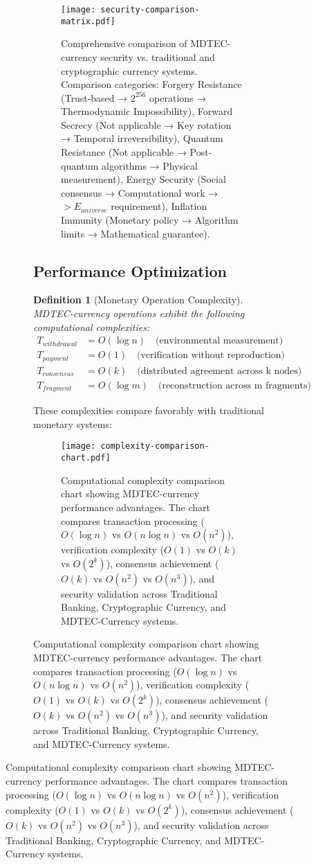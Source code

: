 \documentclass[12pt,a4paper]{article}
\newtheorem{definition}[theorem]{Definition}
\begin{document}
\begin{figure}[H]
\begin{figure}[H]
\begin{figure}[H]
\centering
\texttt{[image: security-comparison-matrix.pdf]}
\caption{Comprehensive comparison of MDTEC-currency security vs. traditional and cryptographic currency systems. Comparison categories: Forgery Resistance (Trust-based → $2^{256}$ operations → Thermodynamic Impossibility), Forward Secrecy (Not applicable → Key rotation → Temporal irreversibility), Quantum Resistance (Not applicable → Post-quantum algorithms → Physical measurement), Energy Security (Social consensus → Computational work → $>E_{universe}$ requirement), Inflation Immunity (Monetary policy → Algorithm limits → Mathematical guarantee).}
\label{fig:security_comparison}
\end{figure}

\subsection{Performance Optimization}

\begin{definition}[Monetary Operation Complexity]
MDTEC-currency operations exhibit the following computational complexities:
\begin{align}
T_{withdrawal} &= O(\log n) \quad \text{(environmental measurement)} \\
T_{payment} &= O(1) \quad \text{(verification without reproduction)} \\
T_{consensus} &= O(k) \quad \text{(distributed agreement across k nodes)} \\
T_{fragment} &= O(\log m) \quad \text{(reconstruction across m fragments)}
\end{align}
\end{definition}

These complexities compare favorably with traditional monetary systems:

\begin{figure}[H]
\centering
\texttt{[image: complexity-comparison-chart.pdf]}
\caption{Computational complexity comparison chart showing MDTEC-currency performance advantages. The chart compares transaction processing ($O(\log n)$ vs $O(n \log n)$ vs $O(n^2)$), verification complexity ($O(1)$ vs $O(k)$ vs $O(2^k)$), consensus achievement ($O(k)$ vs $O(n^2)$ vs $O(n^3)$), and security validation across Traditional Banking, Cryptographic Currency, and MDTEC-Currency systems.}
\label{fig:complexity_comparison_chart}
\end{figure}


\end{figure}
\end{figure}
\end{document}
